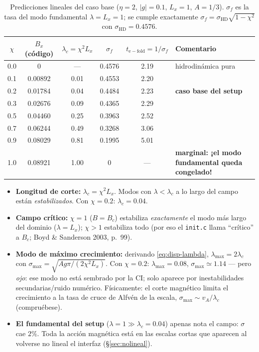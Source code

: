 \documentclass[11pt,a4paper]{article}
\newcommand{\code}[1]{\texttt{#1}}
\begin{document}
\begin{table}[htbp]
\centering\small
\caption{Predicciones lineales del caso base ($\eta=2$, $|g|=0.1$, $L_x=1$, $A=1/3$).
$\sigma_f$ es la tasa del modo fundamental $\lambda=L_x=1$; se cumple exactamente
$\sigma_f=\sigma_\mathrm{HD}\sqrt{1-\chi^2}$ con $\sigma_\mathrm{HD}=0.4576$.}
\begin{tabular}{@{}cccccp{4.35cm}@{}}
\toprule
$\chi$ & $B_x$ (código) & $\lambda_c=\chi^2 L_x$ & $\sigma_f$ & $t_\mathrm{e-fold}=1/\sigma_f$ & Comentario \\
\midrule
0.0 & 0           & ---  & 0.4576 & 2.19 & hidrodinámica pura \\
0.1 & 0.00892     & 0.01 & 0.4553 & 2.20 & \\
0.2 & 0.01784     & 0.04 & 0.4484 & 2.23 & \textbf{caso base del setup} \\
0.3 & 0.02676     & 0.09 & 0.4365 & 2.29 & \\
0.5 & 0.04460     & 0.25 & 0.3963 & 2.52 & \\
0.7 & 0.06244     & 0.49 & 0.3268 & 3.06 & \\
0.9 & 0.08029     & 0.81 & 0.1995 & 5.01 & \\
1.0 & 0.08921     & 1.00 & 0      & ---  & \textbf{marginal: ¡el modo fundamental queda congelado!} \\
\bottomrule
\end{tabular}
\label{tab:chi}
\end{table}

\begin{itemize}[nosep]
  \item \textbf{Longitud de corte:} $\lambda_c=\chi^2 L_x$. Modos con $\lambda<\lambda_c$ a lo
  largo del campo están \emph{estabilizados}. Con $\chi=0.2$: $\lambda_c=0.04$.
  \item \textbf{Campo crítico:} $\chi=1$ ($B=B_c$) estabiliza \emph{exactamente} el modo más
  largo del dominio ($\lambda=L_x$); $\chi>1$ estabiliza todo (por eso el \code{init.c}
  llama ``crítico'' a $B_c$; Boyd \& Sanderson 2003, p.~99).
  \item \textbf{Modo de máximo crecimiento:} derivando \eqref{eq:disp-lambda},
  $\lambda_\mathrm{max}=2\lambda_c$ con $\sigma_\mathrm{max}
  =\sqrt{A g \pi/(2\chi^2 L_x)}$. Con $\chi=0.2$: $\lambda_\mathrm{max}=0.08$,
  $\sigma_\mathrm{max}\simeq1.14$ --- pero \emph{ojo}: ese modo no está sembrado por la CI;
  solo aparece por inestabilidades secundarias/ruido numérico. Físicamente: el corte
  magnético limita el crecimiento a la tasa de cruce de Alfvén de la escala,
  $\sigma_\mathrm{max}\sim v_A/\lambda_c$ (compruébese).
  \item \textbf{El fundamental del setup} ($\lambda=1\gg\lambda_c=0.04$) apenas nota el
  campo: $\sigma$ cae $2\%$. Toda la acción magnética está en las escalas cortas que
  aparecen al volverse no lineal el interfaz (§\ref{sec:nolineal}).
\end{itemize}
\end{document}
